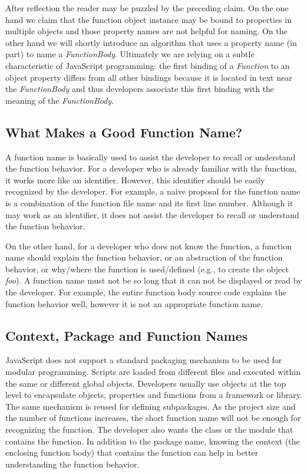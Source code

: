 \documentclass[10pt, preprint]{sigplanconf}
\begin{document}
After reflection the reader may be puzzled by the preceding claim. On the one hand we claim that the function object instance may be bound to properties in multiple objects and those property names are not helpful for naming. On the other hand we will shortly introduce an algorithm that uses a property name (in part) to name a {\textit{FunctionBody}}. Ultimately we are relying on a subtle characteristic of JavaScript programming: the first binding of a {\textit{Function}}  to an object property differs from all other bindings because it is located in text near the {\textit{FunctionBody}} and thus developers associate this first binding with the meaning of the {\textit{FunctionBody}}. 

\subsection{What Makes a Good Function Name?}
A function name is basically used to assist the developer to recall or understand the function behavior. For a developer who is already familiar with the function, it works more like an identifier. However, this identifier should be easily recognized by the developer. For example, a naive proposal for the function name is a combination of the function file name and its first line number. Although it may work as an identifier, it does not assist the developer to recall or understand the function behavior.

 On the other hand, for a developer who does not know the function, a function name should explain the function behavior, or an abstraction of the function behavior, or why/where the function is used/defined (e.g., to create the object \textit{foo}). A function name must not be so long that it can not be displayed or read by the developer. For example, the entire function body source code explains the function behavior well, however it is not an appropriate function name.

\subsection{Context, Package and Function Names}
JavaScript does not support a standard packaging mechanism to be used for modular programming. Scripts are loaded from different files and executed within the same or different global objects. Developers usually use objects at the top level to encapsulate objects, properties and functions from a framework or library. The same mechanism is reused for defining subpackages. As the project size and the number of functions increases, the short function name will not be enough for recognizing the function. The developer also wants the class or the module that contains the function. In addition to the package name, knowing the context (the enclosing function body) that contains the function can help in better understanding the function behavior.
\end{document}
